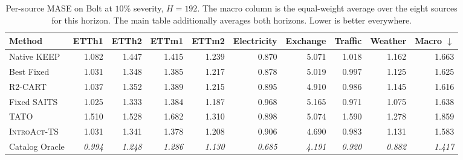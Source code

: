 \documentclass{article}
\newcommand{\oracle}[1]{\textit{\textcolor{phgray}{#1}}}
\newcommand{\introact}{\textsc{IntroAct-TS}}
\begin{document}
\begin{table}[htbp]
  \caption{Per-source MASE on Bolt at $10\%$ severity, $H=192$. The macro column is the
  equal-weight average over the eight sources for this horizon. The main table additionally averages both horizons. Lower is better everywhere.}
  \label{tab:app-src-bolt-192}
  \centering
  \small
  \setlength{\tabcolsep}{3pt}
\begin{tabular*}{\textwidth}{@{\extracolsep{\fill}}lrrrrrrrrr@{}}
    \toprule
    Method & ETTh1 & ETTh2 & ETTm1 & ETTm2 & Electricity & Exchange & Traffic & Weather & Macro $\downarrow$ \\
    \midrule
    Native KEEP & 1.082 & 1.447 & 1.415 & 1.239 & 0.870 & 5.071 & 1.018 & 1.162 & 1.663 \\
    Best Fixed & 1.031 & 1.348 & 1.385 & 1.217 & 0.878 & 5.019 & 0.997 & 1.125 & 1.625 \\
    R2-CART & 1.037 & 1.352 & 1.389 & 1.215 & 0.895 & 4.910 & 0.986 & 1.145 & 1.616 \\
    Fixed SAITS & 1.025 & 1.333 & 1.384 & 1.187 & 0.968 & 5.165 & 0.971 & 1.075 & 1.638 \\
    TATO & 1.510 & 1.528 & 1.682 & 1.310 & 0.898 & 5.074 & 1.590 & 1.278 & 1.859 \\
    \midrule
    \rowcolor{bestgray}\introact{} & 1.031 & 1.341 & 1.378 & 1.208 & 0.906 & 4.690 & 0.983 & 1.131 & 1.583 \\
    \midrule
    Catalog Oracle & \oracle{0.994} & \oracle{1.248} & \oracle{1.286} & \oracle{1.130} & \oracle{0.685} & \oracle{4.191} & \oracle{0.920} & \oracle{0.882} & \oracle{1.417} \\
    \bottomrule
  \end{tabular*}
\end{table}
\end{document}
